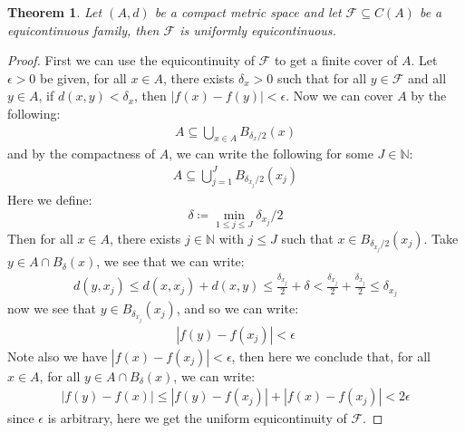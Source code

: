 \documentclass[11pt]{book}
\theoremstyle{break}
\theoremstyle{break}
\newtheorem{thm}{Theorem}[section]
\newcommand{\N}{\mathbb{N}}
\begin{document}
\begin{thm}
Let $(A,d)$ be a compact metric space and let $\mathcal{F} \subseteq C(A)$ be a equicontinuous family, then $\mathcal{F}$ is uniformly equicontinuous. 
\end{thm}
\begin{proof}
First we can use the equicontinuity of $\mathcal{F}$ to get a finite cover of $A$. Let $\epsilon >0$ be given, for all $x \in A$, there exists $\delta_x > 0$ such that for all $y \in \mathcal{F}$ and all $y \in A$, if $d(x,y) < \delta_x$, then $|f(x) - f(y)| < \epsilon$. Now we can cover $A$ by the following:
\begin{align*}
A\subseteq \bigcup_{x \in A} B_{\delta_x / 2}(x)
\end{align*}
and by the compactness of $A$, we can write the following for some $J\in \N$:
\begin{align*}
A \subseteq \bigcup_{j =1}^J B_{\delta_{x_j} / 2}(x_j)
\end{align*}
Here we define: 
$$\delta \coloneqq \min_{1\leq j \leq J} \delta_{x_j}/2$$
Then for all $x \in A$, there exists $j \in \N$ with $j \leq J$ such that $x \in B_{\delta_{x_j}/2} ( x_j)$. Take $y \in A \cap B_{\delta}(x)$, we see that we can write:
\begin{align*}
d(y,x_j) \leq d(x,x_j) + d(x,y) \leq \frac{\delta_{x_j}}{2} + \delta < \frac{\delta_{x_j}}{2} + \frac{\delta_{x_j}}{2} \leq \delta_{x_j}
\end{align*}
now we see that $y \in B_{\delta_{x_j}}(x_j)$, and so we can write:
\begin{align*}
|f(y) - f(x_j)| < \epsilon
\end{align*}
Note also we have $|f(x) - f(x_j)| < \epsilon$, then here we conclude that, for all $x \in A$, for all $y \in A \cap B_{\delta}(x)$, we can write:
\begin{align*}
|f(y) - f(x)| \leq |f(y) - f(x_j)| + |f(x) -f(x_j)| <2\epsilon
\end{align*}
since $\epsilon$ is arbitrary, here we get the uniform equicontinuity of $\mathcal{F}$. 
\end{proof}
\end{document}
